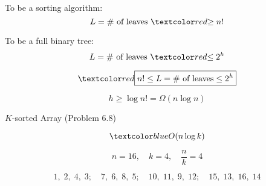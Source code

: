 \begin{frame}{}
  \centering

  \pause
  \vspace{0.30cm}
  \begin{alertblock}{To be a  sorting algorithm:}
    \[
      L = \# \text{ of leaves } \red{\ge}\; n!
    \]
  \end{alertblock}

  \pause
  \vspace{0.50cm}
  \begin{alertblock}{To be a full binary tree:}
    \[
      L = \# \text{ of leaves } \red{\le}\; 2^h
    \]
  \end{alertblock}
\end{frame}

\begin{frame}{}
  \[
	\red{\boxed{n! \le L = \# \text{ of leaves} \le 2^h}}
  \]

  \pause
  \vspace{0.60cm}
  \[
    h \ge \log n! = \Omega(n \log n)
  \]

\end{frame}

\begin{frame}{}
  \begin{exampleblock}{$K$-sorted Array (Problem $6.8$)}

	\pause
    \vspace{-0.50cm}
	\[
	  \blue{O(n \log k)}
	\]
  \end{exampleblock}

  \pause
  \[
    n = 16,\quad k = 4,\quad \frac{n}{k} = 4
  \]

  \[
    1,\;2,\;4,\;3;\quad 7,\;6,\;8,\;5;\quad 10,\;11,\;9,\;12;\quad 15,\;13,\;16,\;14
  \]
\end{frame}

